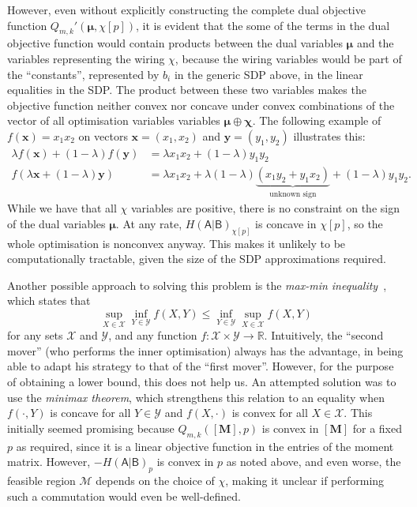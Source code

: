 \documentclass[10pt, a4paper]{article}
\numberwithin{equation}{section} %
\theoremstyle{definition}
\theoremstyle{plain}
\newcommand{\?}{\mathrel{?}} %
\newcommand{\R}{\mathbb{R}} %
\newcommand{\cvec}[1]{\boldsymbol{\mathbf{#1}}}    %
\newcommand{\matr}[2][]{\left[\mathbf{#2}#1\right]} %
\newcommand{\sM}{\mathcal{M}}
\newcommand{\sX}{\mathcal{X}}
\newcommand{\sY}{\mathcal{Y}}
\newcommand{\crv}[1]{\mathsf{#1}}
\begin{document}
                    However, even without explicitly constructing the complete dual objective function \(Q_{m,k}'(\cvec{\mu},\chi[p])\), it is evident that the some of the terms in the dual objective function would contain products between the dual variables \(\cvec{\mu}\) and the variables representing the wiring \(\chi\), because the wiring variables would be part of the ``constants'', represented by \(b_i\) in the generic SDP above, in the linear equalities in the SDP\@. The product between these two variables makes the objective function neither convex nor concave under convex combinations of the vector of all optimisation variables variables \(\cvec{\mu} \oplus \cvec{\chi}\). The following example of \(f(\cvec{x}) = x_1x_2\) on vectors \(\cvec{x} = (x_1, x_2)\) and \(\cvec{y} = (y_1, y_2)\) illustrates this:
                    \begin{align}
                      \lambda f(\cvec{x}) + (1-\lambda)f(\cvec{y}) &= \lambda{x_1x_2} + (1-\lambda){y_1y_2} \\
                      f(\lambda\cvec{x} + (1-\lambda)\cvec{y}) &= \lambda{x_1x_2} + \lambda(1-\lambda)\underbrace{(x_1y_2 + y_1x_2)}_{\text{unknown sign}} + (1-\lambda){y_1y_2}.
                    \end{align}
                    While we have that all \(\chi\) variables are positive, there is no constraint on the sign of the dual variables \(\cvec{\mu}\). At any rate, \(H{(\crv{A}|\crv{B})}_{\chi[p]}\) is concave in \(\chi[p]\), so the whole optimisation is nonconvex anyway. This makes it unlikely to be computationally tractable, given the size of the SDP approximations required.

                  Another possible approach to solving this problem is the \emph{max-min inequality}~\cite[Sec. 5.4]{BoydVand}, which states that 
                  \begin{equation}
                    \sup_{X\in\sX} \inf_{Y\in\sY} f(X,Y) \leq \inf_{Y\in\sY} \sup_{X\in\sX} f(X,Y)
                  \end{equation}
                  for any sets \(\sX\) and \(\sY\), and any function \(f : \sX\times\sY \to \R\). Intuitively, the ``second mover'' (who performs the inner optimisation) always has the advantage, in being able to adapt his strategy to that of the ``first mover''. However, for the purpose of obtaining a lower bound, this does not help us. An attempted solution was to use the \emph{minimax theorem}, which strengthens this relation to an equality when \(f(\cdot,Y)\) is concave for all \(Y\in\sY\) and \(f(X,\cdot)\) is convex for all \(X\in\sX\). This initially seemed promising because \(Q_{m,k}(\matr{M}, p)\) is convex in \(\matr{M}\) for a fixed \(p\) as required, since it is a linear objective function in the entries of the moment matrix. However, \(-H{(\crv{A}|\crv{B})}_p\) is convex in \(p\) as noted above, and even worse, the feasible region \(\sM\) depends on the choice of \(\chi\), making it unclear if performing such a commutation would even be well-defined.
\end{document}
